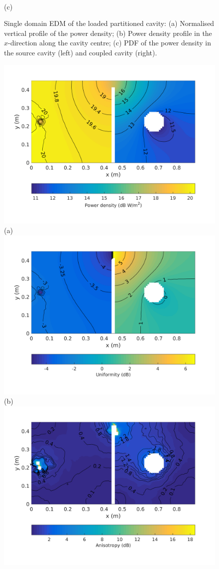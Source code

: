 \documentclass[a4paper]{article}
\numberwithin{equation}{section}
\begin{document}
\begin{figure}[ht]
\begin{center}
\\
{\footnotesize (c)}\\
\vspace{-2mm}
\caption{\label{fg:partcylsdm_profs} Single domain EDM of the loaded partitioned cavity: (a) Normalised vertical profile of the power density; 
(b) Power density profile in the $x$-direction along the cavity centre; (c) PDF of the power density in the source cavity (left) and coupled cavity (right).}
\end{center}
\end{figure}

\begin{figure}[ht]
\begin{center}
\includegraphics[trim={0 11mm 0 12mm},clip,width=0.55\linewidth]{figures/SDM_3D_DL_PowerDensityMap}\\
{\footnotesize (a)}\\
\vspace{2mm}
\includegraphics[trim={0 11mm 0 12mm},clip,width=0.55\linewidth]{figures/SDM_3D_DL_EnergyDensityUniformityMap}\\
{\footnotesize (b)}\\
\vspace{2mm}
\includegraphics[trim={0 11mm 0 12mm},clip,width=0.55\linewidth]{figures/SDM_3D_DL_EnergyDensityAnisotropyMap}\\

\end{center}
\end{figure}
\end{document}
